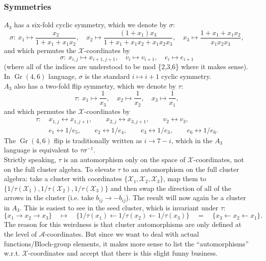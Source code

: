 \documentclass[12pt]{article}
\DeclareMathOperator{\Gr}{Gr}
\def\x{\mathcal{X}}
\def\a{\mathcal{A}}
\begin{document}
\subsubsection*{Symmetries}

$A_3$ has a six-fold cyclic symmetry, which we denote by $\sigma$:
\begin{equation}
	\sigma:~ 
		x_1\mapsto \frac{x_2}{1+x_1+x_1 x_2},\quad
		x_2\mapsto \frac{\left(1+x_1\right) x_3}{1+x_1+x_1 x_2+x_1 x_2x_3}, \quad 
		x_3\mapsto \frac{1+x_1+x_1 x_2}{x_1 x_2 x_3},
\end{equation}
and which permutes the $\x$-coordinates by 
\begin{equation}
	\sigma:~ 
		x_{i,j} \mapsto x_{i+1,j+1}, \quad 
		v_i \mapsto v_{i+1}, \quad 
		e_i \mapsto e_{i+1}
\end{equation}
(where all of the indices are understood to be mod \{2,3,6\} where it makes sense). In $\Gr(4,6)$ language, $\sigma$ is the standard $i\mapsto i+1$ cyclic symmetry.\\

$A_3$ also has a two-fold flip symmetry, which we denote by $\tau$:
\begin{equation}
	\tau:~ 
		x_1\mapsto \frac{1}{x_3},\quad
		x_2\mapsto \frac{1}{x_2}, \quad 
		x_3\mapsto \frac{1}{x_1},
\end{equation}
and which permutes the $\x$-coordinates by
\begin{align}
	\tau:~&
		x_{1,j} \leftrightarrow x_{1,j+1}, \qquad
		x_{2,j} \leftrightarrow x_{3,j+1}, \qquad
		v_2 \leftrightarrow v_{3}, \nonumber \\
		&e_1 \leftrightarrow 1/e_{5},\qquad
		e_2 \leftrightarrow 1/e_{4},\qquad
		e_3 \leftrightarrow 1/e_{3},\qquad
		e_6 \leftrightarrow 1/e_{6}.
\end{align}
The $\Gr(4,6)$ flip is traditionally written as $i\to7-i$, which in the $A_3$ language is equivalent to $\tau\sigma^{-1}$.\\

Strictly speaking, $\tau$ is an automorphism only on the space of $\x$-coordinates, not on the full cluster algebra. To elevate $\tau$ to an automorphism on the full cluster algebra: take a cluster with coordinates $\{\x_1,\x_2,\x_3\}$, map them to $\{1/\tau(\x_1), 1/\tau(\x_2), 1/\tau(\x_3)\}$ and then swap the direction of all of the arrows in the cluster (i.e. take $b_{ij}\to-b_{ij}$). The result will now again be a cluster in $A_3$. This is easiest to see in the seed cluster, which is invariant under $\tau$:
\begin{equation}
	\{x_1\to x_2\to x_3\} \quad \mapsto \quad \{1/\tau(x_1)\leftarrow 1/\tau(x_2) \leftarrow 1/\tau(x_3)\}\quad = \quad\{ x_3 \leftarrow x_2 \leftarrow x_1\}.
\end{equation}
The reason for this weirdness is that cluster automorphisms are only defined at the level of $\a$-coordinates. But since we want to deal with actual functions/Bloch-group elements, it makes more sense to list the ``automorphisms'' w.r.t. $\x$-coordinates and accept that there is this slight funny business. 
\end{document}
